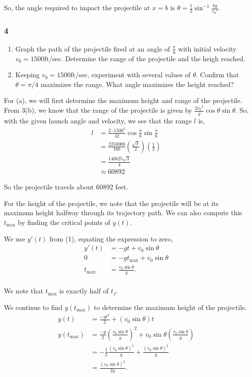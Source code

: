 \documentclass[../hw10]{subfiles}
\begin{document}
So, the angle required to impact the projectile at $x=b$ is $\theta=\frac{1}{2}\sin^{-1}{\frac{bg}{{v_0}^2}}$.

\subsubsection*{4}

\begin{enumerate}[label=\alph*.]
    \item Graph the path of the projectile fired at an angle of $\frac{\pi}{6}$ with initial velocity $v_0=1500$ft/sec. Determine the range of the projectile and the heigh reached.
    \item Keeping $v_0=1500$ft/sec, experiment with several values of $\theta$. Confirm that $\theta=\pi/4$ maximizes the range. What angle maximizes the height reached? 
\end{enumerate}

For (a), we will first determine the maximum height and range of the projectile. From 3(b), we know that the range of the projectile is given by $\frac{2{v_0}^2}{g}\cos{\theta}\sin{\theta}$. So, with the given launch angle and velocity, we see that the range $l$ is,
\begin{align*}
    l&=\frac{2\cdot{1500}^2}{32}\cos{\frac{\pi}{6}}\sin{\frac{\pi}{6}} \\
    &=\frac{2250000}{166}\left( \frac{\sqrt{3}}{2} \right)\left( \frac{1}{2} \right) \\
    &=\frac{140625\sqrt{3}}{4} \\
    &\approx 60892
\end{align*}

So the projectile travels about 60892 feet.

For the height of the projectile, we note that the projectile will be at its maximum height halfway through its trajectory path. We can also compute this $t_{\max}$ by finding the critical points of $y(t)$.

We use $y'(t)$ from (1), equating the expression to zero,
\begin{align*}
    y'(t)&=-gt+v_0\sin{\theta} \\
    0&=-gt_{\max}+v_0\sin{\theta} \\
    t_{\max}&=\frac{v_0\sin{\theta}}{g}. \\
\end{align*}

We note that $t_{\max}$ is exactly half of $t_f$.

We continue to find $y\left( t_{\max} \right)$ to determine the maximum height of the projectile.
\begin{align*}
    y(t)&=\frac{-gt^2}{2}+(v_0\sin{\theta})t \\
    y(t_{\max})&=\frac{-g}{2}{\left(\frac{v_0\sin{\theta}}{g}\right)}^2+v_0\sin{\theta}\left(\frac{v_0\sin{\theta}}{g}\right) \\
    &=-\frac{1}{2}\frac{{(v_0\sin{\theta})}^2}{g}+\frac{{(v_0\sin{\theta})}^2}{g} \\
    &= \frac{{(v_0\sin{\theta})}^2}{2g}.
\end{align*}
\end{document}
